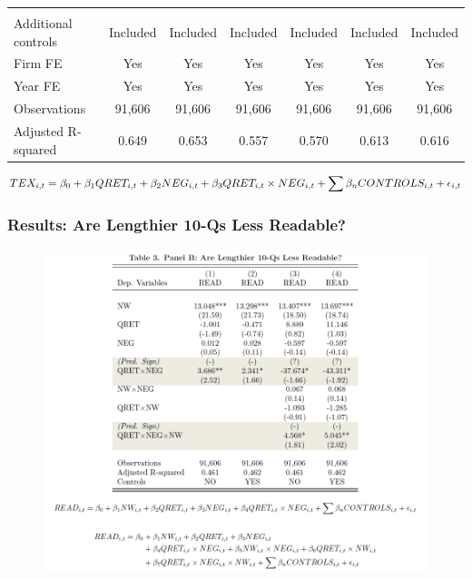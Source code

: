 \documentclass{beamer}
\begin{document}
\begin{frame}
\begin{table}[H]
\begin{center}
\begin{tabular}{lcccccc}
			&   &   &   &   &   &  \\
			Additional controls & Included & Included & Included & Included & Included & Included \\
			Firm FE & Yes & Yes & Yes & Yes & Yes & Yes  \\
			Year FE & Yes & Yes & Yes & Yes & Yes & Yes  \\
			Observations & 91,606 & 91,606 & 91,606 & 91,606 & 91,606 & 91,606 \\
			Adjusted R-squared & 0.649 & 0.653 & 0.557 & 0.570 & 0.613 & 0.616 \\
			\bottomrule
			\bottomrule
		\end{tabular}%
	\end{center}
	\begin{footnotesize}
		\setcounter{equation}{0}
		\begin{equation} \tiny
		TEX_{i,t}=\beta_0+\beta_1QRET_{i,t}+\beta_2NEG_{i,t}+\beta_3QRET_{i,t}\times NEG_{i,t}+\sum\beta_nCONTROLS_{i,t}+\epsilon_{i,t}
		\end{equation}

	\end{footnotesize}
\end{table}%

\end{frame}
\begin{frame}
\frametitle{Results: Are Lengthier 10-Qs Less Readable?}
	\begin{figure}[h]
	\centering
	\includegraphics[width=0.9\linewidth]{tab3panB}
	\label{tab3panB}
	\end{figure}
\end{frame}
\end{document}
